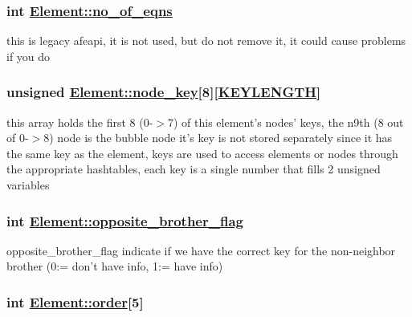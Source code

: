 \hypertarget{classElement_r16}{
\subsubsection[no\_\-of\_\-eqns]{\setlength{\rightskip}{0pt plus 5cm}int \hyperlink{classElement_r16}{Element::no\_\-of\_\-eqns}}}
\label{classElement_r16}


this is legacy afeapi, it is not used, but do not remove it, it could cause problems if you do 

\hypertarget{classElement_r7}{
\subsubsection[node\_\-key]{\setlength{\rightskip}{0pt plus 5cm}unsigned \hyperlink{classElement_r7}{Element::node\_\-key}\mbox{[}8\mbox{]}\mbox{[}\hyperlink{constant_8h_a10}{KEYLENGTH}\mbox{]}}}
\label{classElement_r7}


this array holds the first 8 (0-$>$7) of this element's nodes' keys, the n9th (8 out of 0-$>$8) node is the bubble node it's key is not stored separately since it has the same key as the element, keys are used to access elements or nodes through the appropriate hashtables, each key is a single number that fills 2 unsigned variables 

\hypertarget{classElement_r2}{
\subsubsection[opposite\_\-brother\_\-flag]{\setlength{\rightskip}{0pt plus 5cm}int \hyperlink{classElement_r2}{Element::opposite\_\-brother\_\-flag}}}
\label{classElement_r2}


opposite\_\-brother\_\-flag indicate if we have the correct key for the non-neighbor brother (0:= don't have info, 1:= have info) 

\hypertarget{classElement_r12}{
\subsubsection[order]{\setlength{\rightskip}{0pt plus 5cm}int \hyperlink{classElement_r12}{Element::order}\mbox{[}5\mbox{]}}}
\label{classElement_r12}


